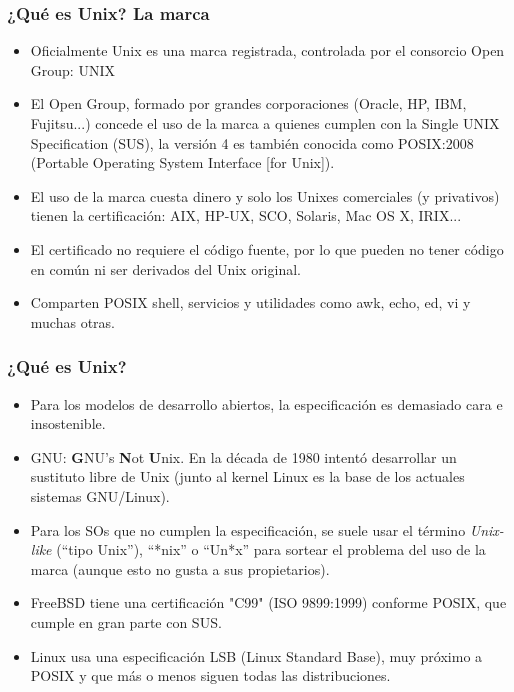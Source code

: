 \documentclass{beamer}
\begin{document}


\begin{frame}
\frametitle{¿Qué es Unix? La marca}


\begin{itemize}
\item Oficialmente Unix es una marca registrada, controlada por el consorcio Open Group: \textsc{UNIX\texttrademark}
\item El Open Group, formado por grandes corporaciones (Oracle, HP, IBM, Fujitsu...) concede el uso de la marca a quienes cumplen con la Single UNIX Specification (SUS), la versión 4 es también conocida como POSIX:2008 (Portable Operating System Interface [for Unix]).
\item El uso de la marca cuesta dinero y solo los Unixes comerciales (y privativos) tienen la certificación: AIX, HP-UX, SCO, Solaris, Mac OS X, IRIX...
\item El certificado no requiere el código fuente, por lo que pueden no tener código en común ni ser derivados del Unix original.
\item Comparten POSIX shell, servicios y utilidades como awk, echo, ed, vi y muchas otras.
\end{itemize}

\end{frame}



\begin{frame}
\frametitle{¿Qué es Unix?}


\begin{itemize}
\item Para los modelos de desarrollo abiertos, la especificación es demasiado cara e insostenible.
\item GNU: \textbf{G}NU's \textbf{N}ot \textbf{U}nix. En la década de 1980 intentó desarrollar un sustituto libre de Unix (junto al kernel Linux es la base de los actuales sistemas GNU/Linux).
\item Para los SOs que no cumplen la especificación, se suele usar el término \textit{Unix-like} (``tipo Unix''), ``*nix'' o ``Un*x'' para sortear el problema del uso de la marca (aunque esto no gusta a sus propietarios).
\item FreeBSD tiene una certificación "C99" (ISO 9899:1999) conforme POSIX, que cumple en gran parte con SUS.
\item Linux usa una especificación LSB (Linux Standard Base), muy próximo a POSIX y que más o menos siguen todas las distribuciones. 
\end{itemize}

\end{frame}
\end{document}
